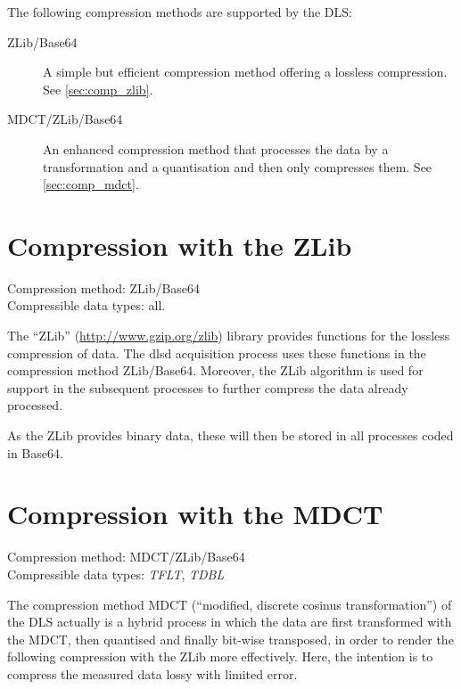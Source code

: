 \documentclass[a4paper,12pt,BCOR6mm,bibtotoc,idxtotoc]{scrbook}
\begin{document}
The following compression methods are supported by the DLS:

\begin{description}

\item[ZLib/Base64] A simple but efficient compression method offering a
lossless compression. See \autoref{sec:comp_zlib}.

\item[MDCT/ZLib/Base64] An enhanced compression method that processes the data
by a transformation and a quantisation and then only compresses them. See
\autoref{sec:comp_mdct}.

\end{description}



\section{Compression with the ZLib} \label{sec:comp_zlib}

Compression method: ZLib/Base64\\ Compressible data types: all.

The ``ZLib'' (\url{http://www.gzip.org/zlib}) library provides functions for the lossless compression of data. The dlsd acquisition process uses these functions in the compression method ZLib/Base64. Moreover, the ZLib algorithm is used for support in the subsequent processes to further compress the data already processed.

As the ZLib provides binary data, these will then be stored in all processes coded in Base64.


\section{Compression with the MDCT} \label{sec:comp_mdct} 

Compression method: MDCT/ZLib/Base64\\ Compressible data types: \textit{TFLT}, \textit{TDBL}

The compression method MDCT (``modified, discrete cosinus
transformation'') of the DLS actually is a hybrid process in which the
data are first transformed with the MDCT, then quantised and finally
bit-wise transposed, in order to render the following compression with
the ZLib more effectively. Here, the intention is to compress the
measured data lossy with limited error.
\end{document}
